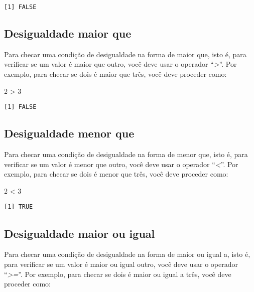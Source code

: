 \documentclass[
  letterpaper,
  DIV=11,
  numbers=noendperiod]{scrreprt}
\newenvironment{Shaded}{\begin{snugshade}}{\end{snugshade}}
\newcommand{\DecValTok}[1]{\textcolor[rgb]{0.68,0.00,0.00}{#1}}
\newcommand{\SpecialCharTok}[1]{\textcolor[rgb]{0.37,0.37,0.37}{#1}}
\begin{document}
\begin{verbatim}
[1] FALSE
\end{verbatim}

\subsection{Desigualdade maior que}\label{desigualdade-maior-que}

Para checar uma condição de desigualdade na forma de maior que, isto é,
para verificar se um valor é maior que outro, você deve usar o operador
``\emph{\textgreater{}}''. Por exemplo, para checar se dois é maior que
três, você deve proceder como:

\begin{Shaded}
\begin{Highlighting}[]
\DecValTok{2} \SpecialCharTok{\textgreater{}} \DecValTok{3}
\end{Highlighting}
\end{Shaded}

\begin{verbatim}
[1] FALSE
\end{verbatim}

\subsection{Desigualdade menor que}\label{desigualdade-menor-que}

Para checar uma condição de desigualdade na forma de menor que, isto é,
para verificar se um valor é menor que outro, você deve usar o operador
``\emph{\textless{}}''. Por exemplo, para checar se dois é menor que
três, você deve proceder como:

\begin{Shaded}
\begin{Highlighting}[]
\DecValTok{2} \SpecialCharTok{\textless{}} \DecValTok{3}
\end{Highlighting}
\end{Shaded}

\begin{verbatim}
[1] TRUE
\end{verbatim}

\subsection{Desigualdade maior ou
igual}\label{desigualdade-maior-ou-igual}

Para checar uma condição de desigualdade na forma de maior ou igual a,
isto é, para verificar se um valor é maior ou igual outro, você deve
usar o operador ``\emph{\textgreater=}''. Por exemplo, para checar se
dois é maior ou igual a três, você deve proceder como:
\end{document}
